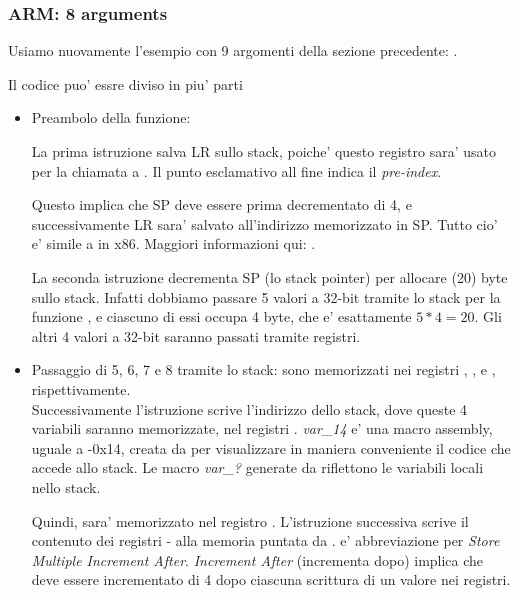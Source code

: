 \subsubsection{ARM: 8 arguments}

Usiamo nuovamente l'esempio con 9 argomenti della sezione precedente: .



\myparagraph{\OptimizingKeilVI: \ARMMode}



Il codice puo' essre diviso in piu' parti

\begin{itemize}
\item Preambolo della funzione:

La prima istruzione  salva \ac{LR} sullo stack, poiche' questo registro sara' usato per la chiamata a \printf.
Il punto esclamativo all fine indica il \emph{pre-index}.

Questo implica che \ac{SP} deve essere prima decrementato di 4, e successivamente \ac{LR} sara' salvato all'indirizzo memorizzato in \ac{SP}.
Tutto cio' e' simile a \PUSH in x86.
Maggiori informazioni qui: .

La seconda istruzione  decrementa \ac{SP} (lo \gls{stack pointer}) per allocare  (20) byte sullo stack.
Infatti dobbiamo passare 5 valori a 32-bit tramite lo stack per la funzione \printf, e ciascuno di essi occupa 4 byte, che e' esattamente $5*4=20$.
Gli altri 4 valori a 32-bit saranno passati tramite registri.

\item Passaggio di 5, 6, 7 e 8 tramite lo stack: sono memorizzati nei registri , ,  e , rispettivamente.\\
Successivamente l'istruzione  scrive l'indirizzo dello stack, dove queste 4 variabili saranno memorizzate,
nel registri .
\emph{var\_14} e' una macro assembly, uguale a -0x14, creata da \IDA per visualizzare in maniera conveniente il codice che accede allo stack.
Le macro \emph{var\_?} generate da \IDA riflettono le variabili locali nello stack.

Quindi,  sara' memorizzato nel registro .
L'istruzione successiva  scrive il contenuto dei registri - alla memoria puntata da .
 e' abbreviazione per \emph{Store Multiple Increment After}. 
\emph{Increment After} (incrementa dopo) implica che  deve essere incrementato di 4 dopo ciascuna scrittura di un valore nei registri.


\end{itemize}
